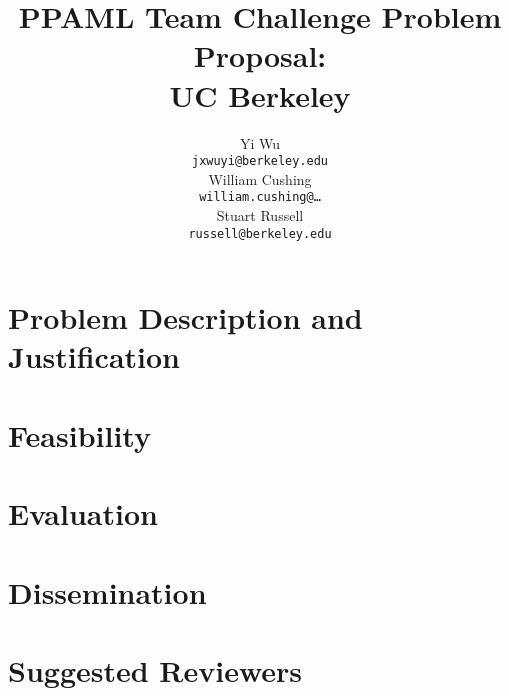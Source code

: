\documentclass{article} %
\title{PPAML Team Challenge Problem Proposal:\\ UC Berkeley}
\author{
Yi Wu\\
\texttt{jxwuyi@berkeley.edu} \\
\And
William Cushing \\
\texttt{william.cushing@\dots} \\
\And
Stuart Russell \\
\texttt{russell@berkeley.edu} \\
}
\begin{document}
\maketitle

\section{Problem Description and Justification}


\section{Feasibility}


\section{Evaluation}


\section{Dissemination}


\section{Suggested Reviewers}



{\small


}
\end{document}
